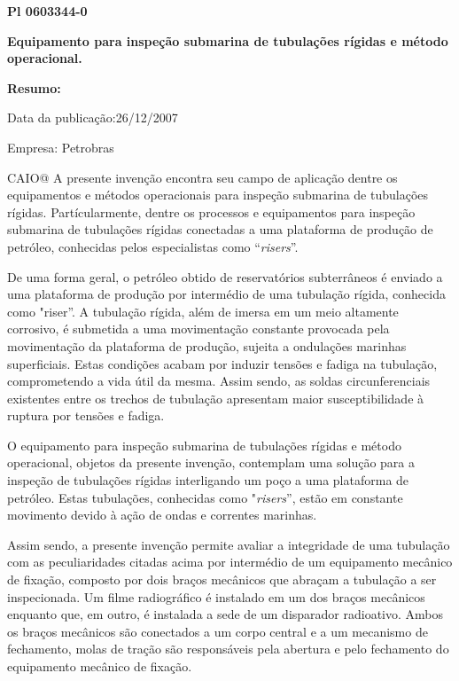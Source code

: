 \documentclass[a4paper,12pt]{article}
\begin{document}
\vspace{1,0cm}
 \begin{center}
  \textbf{Pl 0603344-0} 
 
 \textbf{Equipamento para inspeção submarina de tubulações rígidas e método operacional.}
 \end{center}
 
 \textbf{Resumo:}
 
 Data da publicação:26/12/2007
 
 Empresa: Petrobras
 
 \vspace{1,0cm}

CAIO@ A presente invenção encontra seu campo de aplicação dentre os
equipamentos e métodos operacionais para inspeção submarina de
tubulações rígidas. Partícularmente, dentre os processos e equipamentos
para inspeção submarina de tubulações rígidas conectadas a uma
plataforma de produção de petróleo, conhecidas pelos especialistas como
“\textit{risers}”.

De uma forma geral, o petróleo obtido de reservatórios subterrâneos
é enviado a uma plataforma de produção por intermédio de uma tubulação
rígida, conhecida como "riser”. A tubulação rígida, além de imersa em um
meio altamente corrosivo, é submetida a uma movimentação constante
provocada pela movimentação da plataforma de produção, sujeita a
ondulações marinhas superficiais. Estas condições acabam por induzir
tensões e fadiga na tubulação, comprometendo a vida útil da mesma. Assim sendo, as soldas circunferenciais existentes entre os trechos
de tubulação apresentam maior susceptibilidade à ruptura por tensões e fadiga.

O equipamento para inspeção submarina de tubulações rígidas e
método operacional, objetos da presente invenção, contemplam uma
solução para a inspeção de tubulações rígidas interligando um poço a uma
plataforma de petróleo. Estas tubulações, conhecidas como "\textit{risers}”, estão
em constante movimento devido à ação de ondas e correntes marinhas.

Assim sendo, a presente invenção permite avaliar a integridade de
uma tubulação com as peculiaridades citadas acima por intermédio de um
equipamento mecânico de fixação, composto por dois braços mecânicos
que abraçam a tubulação a ser inspecionada. Um filme radiográfico é
instalado em um dos braços mecânicos enquanto que, em outro, é instalada
a sede de um disparador radioativo. Ambos os braços mecânicos são
conectados a um corpo central e a um mecanismo de fechamento, molas de
tração são responsáveis pela abertura e pelo fechamento do equipamento
mecânico de fixação.
\end{document}
